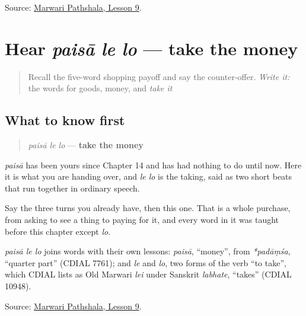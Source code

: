 \begin{tcolorbox}[breakable,colback=teal!4,colframe=teal!35!black,title={Before you move on}]
Source: \href{https://www.marwaripathshala.com/marwari-lesson-9-english}{Marwari Pathshala, Lesson 9}.
\end{tcolorbox}
\section[paisā le lo]{Hear \emph{paisā le lo} — take the money}

\label{lesson:MW-C24-hear-pay}



\begin{quote}
Recall the five-word shopping payoff and say the counter-offer. \emph{Write it:} the words for goods, money, and \emph{take it}
\end{quote}

\subsection*{What to know first}
\begin{quote}
\emph{paisā le lo} — \textbf{take the money}
\end{quote}

\emph{paisā} has been yours since Chapter 14 and has had nothing to do until now. Here it is what you are handing over, and \emph{le lo} is the taking, said as two short beats that run together in ordinary speech.

Say the three turns you already have, then this one. That is a whole purchase, from asking to see a thing to paying for it, and every word in it was taught before this chapter except \emph{lo}.

\begin{cousinweb}
\emph{paisā le lo} joins words with their own lessons: \emph{paisā}, \textquotedblleft{}money\textquotedblright{}, from \emph{*padāṃśa}, \textquotedblleft{}quarter part\textquotedblright{} (CDIAL 7761); and \emph{le} and \emph{lo}, two forms of the verb \textquotedblleft{}to take\textquotedblright{}, which CDIAL lists as Old Marwari \emph{lei} under Sanskrit \emph{labhate}, \textquotedblleft{}takes\textquotedblright{} (CDIAL 10948).
\end{cousinweb}

\begin{tcolorbox}[breakable,colback=teal!4,colframe=teal!35!black,title={Before you move on}]
Source: \href{https://www.marwaripathshala.com/marwari-lesson-9-english}{Marwari Pathshala, Lesson 9}.
\end{tcolorbox}
